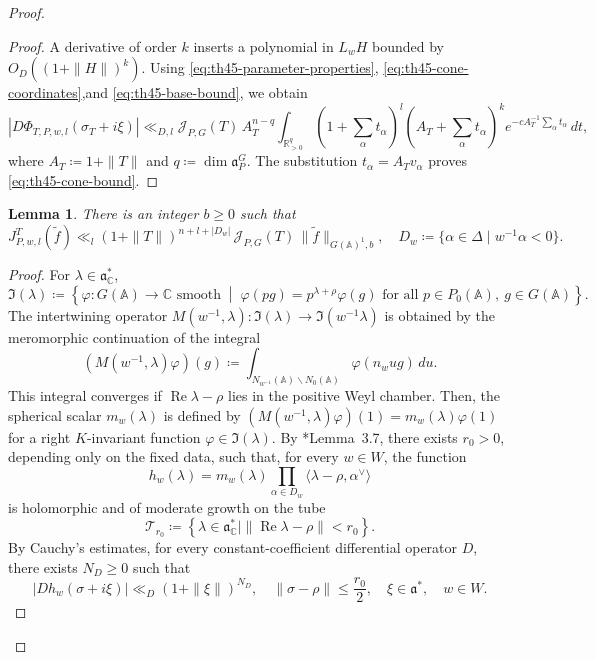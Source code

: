 \documentclass[12pt]{amsart}
\theoremstyle{definition}
\theoremstyle{plain}
\newtheorem{lemma}[definition]{Lemma}
\theoremstyle{remark}
\def\C{\mathbb{C}}%
\def\R{\mathbb{R}}%
\def\A{\mathbb{A}}%
\newcommand{\fa}{\mathfrak{a}}
\newcommand{\fI}{\mathfrak{I}}
\newcommand{\cJ}{\mathcal{J}}
\numberwithin{equation}{section}
\newcommand{\tf}{\tilde{f}}
\begin{document}
\begin{proof}
\begin{proof}
A derivative of order $k$ inserts a polynomial in $L_wH$ bounded
by $O_D((1+\|H\|)^k)$. 
Using \eqref{eq:th45-parameter-properties}, \eqref{eq:th45-cone-coordinates},and \eqref{eq:th45-base-bound}, we obtain
\[
 |D\Phi_{T,P,w,l}(\sigma_T+i\xi)|
 \ll_{D,l}\cJ_{P,G}(T) \, A_T^{n-q}\int_{\R_{>0}^{q}}
 (1+\textstyle\sum_\alpha t_\alpha)^l
 (A_T+\textstyle\sum_\alpha t_\alpha)^k
 e^{-cA_T^{-1}\sum_\alpha t_\alpha}\,dt,
\]
where $A_T\coloneqq 1+\|T\|$ and $q\coloneqq\dim\fa_P^G$.
The substitution \(t_\alpha=A_Tv_\alpha\) proves
\eqref{eq:th45-cone-bound}.
\end{proof}

\begin{lemma}
\label{lem:th45-bruhat}
There is an integer $b\geq0$ such that
\begin{equation}\label{eq:th45-bruhat-bound}
 J_{P,w,l}^T(\tf)
 \ll_l (1+\|T\|)^{n+l+|D_w|}\, \cJ_{P,G}(T)\,  \|\tf\|_{G(\A)^1,b},
 \quad D_w\coloneqq \{\alpha\in\Delta\mid w^{-1}\alpha<0\}.
\end{equation}
\end{lemma}
\begin{proof}
For $\lambda\in\fa^*_\C$,
\[
 \fI(\lambda)
 \coloneqq
 \left\{
 \varphi\colon G(\mathbb A)\longrightarrow\mathbb C
 \text{ smooth}
 \;\middle|\;
 \varphi(pg)=p^{\lambda+\rho}\varphi(g)
 \text{ for all }p\in P_0(\mathbb A),\ g\in G(\mathbb A)
 \right\}.
\]
The intertwining operator $M(w^{-1},\lambda)\colon \fI(\lambda)\to \fI(w^{-1}\lambda)$ is obtained by the meromorphic continuation of the integral
\[
 (M(w^{-1},\lambda)\varphi)(g)
 \coloneqq
 \int_{N_{w^{-1}}(\A)\backslash N_0(\A)}
 \varphi(n_wug)\,du.
\]
This integral converges if $\operatorname{Re}\lambda-\rho$ lies in the positive Weyl chamber. 
Then, the spherical scalar $m_w(\lambda)$ is defined by $(M(w^{-1},\lambda)\varphi)(1)=m_w(\lambda)\varphi(1)$ for a right $K$-invariant function $\varphi\in\fI(\lambda)$.
By \cite{FL11semi}*{Lemma~3.7}, there exists $r_0>0$, depending
only on the fixed data, such that, for every $w\in W$, the function
\[
 h_w(\lambda) = m_w(\lambda)
 \prod_{\alpha\in D_w}
 \langle\lambda-\rho,\alpha^\vee\rangle
\]
is holomorphic and of moderate growth on the tube
\[
 \mathcal T_{r_0}\coloneqq 
 \left\{
 \lambda\in\fa_{\mathbb C}^* \mid
 \|\operatorname{Re}\lambda-\rho\|<r_0
 \right\}.
\]
By Cauchy's estimates, for every constant-coefficient differential
operator $D$, there exists $N_D\ge0$ such that
\begin{equation}\label{eq:Dh_w}
 |D h_w(\sigma+i\xi)|
 \ll_D (1+\|\xi\|)^{N_D},
 \quad
  \|\sigma-\rho\|\le \frac{r_0}{2},
 \quad \xi\in\fa^*,
 \quad w\in W.    
\end{equation}



\end{proof}
\end{proof}
\end{document}
